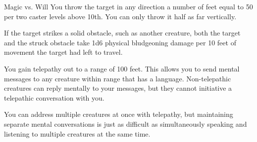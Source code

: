 \begin{spellheader}
    \begin{spelltargetinginfo}
    \end{spelltargetinginfo}
\end{spellheader}
\begin{spellcontent}
    \begin{spelleffects}
        \begin{spellattack}{Magic vs. Will}
            \spellsuccess You throw the target in any direction a number of feet equal to 50  per two caster levels above 10th. You can only throw it half as far vertically.

            If the target strikes a solid obstacle, such as another creature, both the target and the struck obstacle take 1d6 physical bludgeoning damage per 10 feet of movement the target had left to travel.
        \end{spellattack}
    \end{spelleffects}
\end{spellcontent}
\begin{spellfooter}

\end{spellfooter}

\begin{spellheader}
    \begin{spelltargetinginfo}
    \end{spelltargetinginfo}
\end{spellheader}
\begin{spellcontent}
    \begin{spelleffects}
        \spelleffect You gain telepathy out to a range of 100 feet. This allows you to send mental messages to any creature within range that has a language. Non-telepathic creatures can reply mentally to your messages, but they cannot initiative a telepathic conversation with you.

        You can address multiple creatures at once with telepathy, but maintaining separate mental conversations is just as difficult as simultaneously speaking and listening to multiple creatures at the same time. 
        \spelldur{\durlong}
    \end{spelleffects}
\end{spellcontent}
\begin{spellfooter}

\end{spellfooter}

